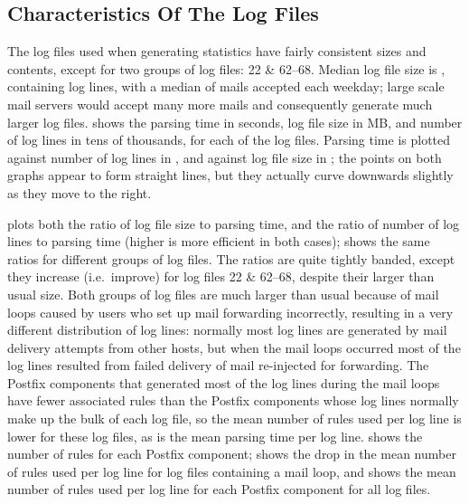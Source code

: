 \subsection{Characteristics Of The \numberOFlogFILES{} Log Files}

\label{Characteristics of the 93 log files}

The \numberOFlogFILES{} log files used when generating statistics have
fairly consistent sizes and contents, except for two groups of log files:
22 \& 62--68.  Median log file size is
, containing
 log lines, with a median
of  mails accepted
each weekday; large scale mail servers would accept many more mails and
consequently generate much larger log files.   shows the parsing time in seconds,
log file size in MB, and number of log lines in tens of thousands, for each
of the \numberOFlogFILES{} log files.  Parsing time is plotted against
number of log lines in , and against log file size in ; the points on both graphs appear to form straight lines,
but they actually curve downwards slightly as they move to the right.

plots both the ratio of log file size to parsing time, and the ratio of
number of log lines to parsing time (higher is more efficient in both
cases);  shows the same ratios for different groups of log files.  The
ratios are quite tightly banded, except they increase (i.e.\ improve) for
log files 22 \& 62--68, despite their larger than usual size.  Both groups
of log files are much larger than usual because of mail loops caused by
users who set up mail forwarding incorrectly, resulting in a very different
distribution of log lines: normally most log lines are generated by mail
delivery attempts from other hosts, but when the mail loops occurred most
of the log lines resulted from failed delivery of mail re-injected for
forwarding.  The Postfix components that generated most of the log lines
during the mail loops have fewer associated rules than the Postfix
components whose log lines normally make up the bulk of each log file, so
the mean number of rules used per log line is lower for these log files, as
is the mean parsing time per log line.   shows the number of rules for each Postfix component;
 shows the drop in the
mean number of rules used per log line for log files containing a mail
loop, and  shows the mean number of rules used per log line for each
Postfix component for all log files.


